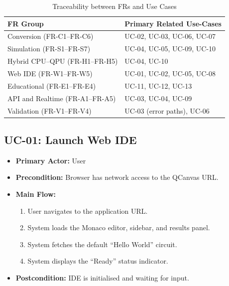\begin{table}[H]
\centering
\caption{Traceability between FRs and Use Cases}
\label{tab:fr-uc-traceability}
\begin{tabular}{p{} p{}}
\toprule
\textbf{FR Group} & \textbf{Primary Related Use-Cases} \\
\midrule
Conversion (FR-C1--FR-C6) & UC-02, UC-03, UC-06, UC-07 \\
Simulation (FR-S1--FR-S7) & UC-04, UC-05, UC-09, UC-10 \\
Hybrid CPU--QPU (FR-H1--FR-H5) & UC-04, UC-10 \\
Web IDE (FR-W1--FR-W5) & UC-01, UC-02, UC-05, UC-08 \\
Educational (FR-E1--FR-E4) & UC-11, UC-12, UC-13 \\
API and Realtime (FR-A1--FR-A5) & UC-03, UC-04, UC-09 \\
Validation (FR-V1--FR-V4) & UC-03 (error paths), UC-06 \\
\bottomrule
\end{tabular}
\end{table}

\subsection{UC-01: Launch Web IDE}
\begin{itemize}
    \item \textbf{Primary Actor:} User
    \item \textbf{Precondition:} Browser has network access to the QCanvas URL.
    \item \textbf{Main Flow:}
    \begin{enumerate}
        \item User navigates to the application URL.
        \item System loads the Monaco editor, sidebar, and results panel.
        \item System fetches the default ``Hello World'' circuit.
        \item System displays the ``Ready'' status indicator.
    \end{enumerate}
    \item \textbf{Postcondition:} IDE is initialised and waiting for input.
\end{itemize}

